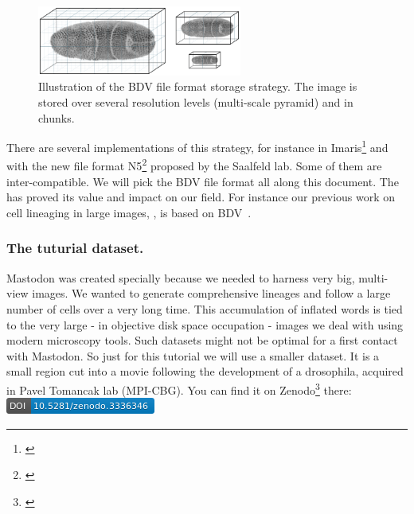 \begin{figure}
    \centering
    \includegraphics[width=0.6\textwidth]{figures/BdvTikz-pyramidblocks.png}
    \caption{Illustration of the BDV file format storage strategy. The image is stored over several resolution levels (multi-scale pyramid) and in chunks.}
    \label{fig:BDVchunks}
\end{figure}

There are several implementations of this strategy, for instance in Imaris\footnote{\href{http://open.bitplane.com/Default.aspx?tabid=268}{}} and with the new file format N5\footnote{\href{https://github.com/saalfeldlab/n5}{}} proposed by the Saalfeld lab.
Some of them are inter-compatible.
We will pick the BDV file format all along this document. 
The \Bdv has proved its value and impact on our field.
For instance our previous work on cell lineaging in large images, , is based on BDV~\cite{MaMuT}.



\subsubsection{The tuturial dataset.}

Mastodon was created specially because we needed to harness very big, multi-view images. We wanted to generate  comprehensive lineages and follow a large number of cells over a very long time.
This accumulation of inflated words is tied to the very large  - in objective disk space  occupation - images we deal with using modern microscopy tools. 
Such datasets might not be optimal for a first contact with Mastodon.
So just for this tutorial we will use a smaller dataset.
It is a small region cut into a movie following the development of a drosophila, acquired in Pavel Tomancak lab (MPI-CBG).
You can find it on Zenodo\footnote{\href{https://zenodo.org/record/3336346}{}} there: \href{https://doi.org/10.5281/zenodo.3336346}{\includegraphics[height=1.5\fontcharht\font`\B]{figures/zenodo3336346.png}}

